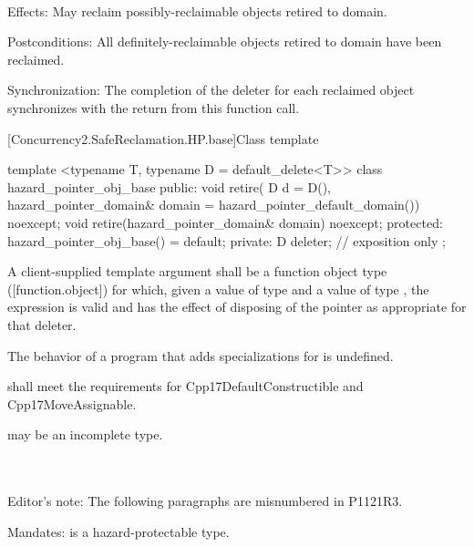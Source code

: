 \\
\hspace*{1.1em}

\pnum
Effects: May reclaim possibly-reclaimable objects retired to domain.

\pnum
Postconditions: All definitely-reclaimable objects retired to domain have been reclaimed.

\pnum
Synchronization: The completion of the deleter for each reclaimed object synchronizes
with the return from this function call.

[Concurrency2.SafeReclamation.HP.base]{Class template }

\begin{codeblock}
template <typename T, typename D = default_delete<T>>
class hazard_pointer_obj_base {
public:
  void retire(
    D d = D(),
    hazard_pointer_domain& domain = hazard_pointer_default_domain())
    noexcept;
  void retire(hazard_pointer_domain& domain) noexcept;
protected:
  hazard_pointer_obj_base() = default;
private:
  D deleter; // exposition only
};
\end{codeblock}

\pnum
A client-supplied template argument  shall be a function object type ([function.object])
for which, given a value  of type  and a value  of type , the expression  is valid and has the effect of disposing of the pointer as appropriate for that deleter.

\pnum
The behavior of a program that adds specializations for  is undefined.

\pnum
{} shall meet the requirements for Cpp17DefaultConstructible and Cpp17MoveAssignable.

\pnum
{} may be an incomplete type.
\\

\\
\hspace*{1.1em}\\
\hspace*{1.1em}

Editor's note: The following paragraphs are misnumbered in P1121R3.

\pnum
Mandates:  is a hazard-protectable type.

